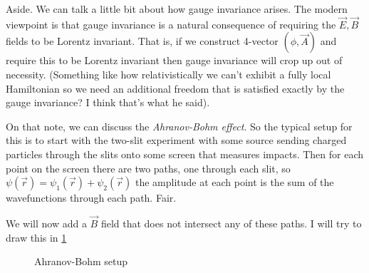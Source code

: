 \documentclass[10pt]{report}
\begin{document}
{\small Aside. We can talk a little bit about how gauge invariance arises. The modern viewpoint is that gauge invariance is a natural consequence of requiring the $\vec{E}, \vec{B}$ fields to be Lorentz invariant. That is, if we construct 4-vector $(\phi, \vec{A})$ and require this to be Lorentz invariant then gauge invariance will crop up out of necessity. (Something like how relativistically we can't exhibit a fully local Hamiltonian so we need an additional freedom that is satisfied exactly by the gauge invariance? I think that's what he said).}

On that note, we can discuss the \emph{Ahranov-Bohm effect}. So the typical setup for this is to start with the two-slit experiment with some source sending charged particles through the slits onto some screen that measures impacts. Then for each point on the screen there are two paths, one through each slit, so $\psi(\vec{r}) = \psi_1(\vec{r}) + \psi_2(\vec{r})$ the amplitude at each point is the sum of the wavefunctions through each path. Fair.

We will now add a $\vec{B}$ field that does not intersect any of these paths. I will try to draw this in \ref{4.30.AB}
\begin{figure}[!h]
    \centering
    \caption{Ahranov-Bohm setup}
    \label{4.30.AB}
\end{figure}
\end{document}
